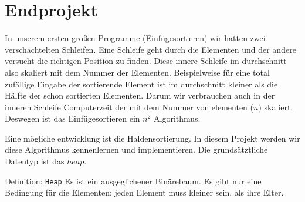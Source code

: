 \section{Endprojekt}


In unserem ersten großen Programme (Einfügesortieren) wir hatten
zwei verschachtelten Schleifen. Eine Schleife geht durch die Elementen
und der andere versucht die richtigen Position zu finden. Diese
innere Schleife im durchschnitt also skaliert mit dem Nummer der Elementen.
Beispielweise für eine total zufällige Eingabe der sortierende Element ist im 
durchschnitt kleiner als die Hälfte der schon sortierten Elementen. Darum 
wir verbrauchen  auch in der inneren Schleife Computerzeit der mit 
dem Nummer von elementen ($n$) skaliert. Deswegen ist das Einfügesortieren
ein $n^2$ Algorithmus.

Eine mögliche entwicklung ist die Haldensortierung. In diesem Projekt werden wir 
diese Algorithmus kennenlernen und implementieren. Die grundsätztliche Datentyp ist 
das $heap$.

\begin{myexampleblock}{Definition: \texttt{Heap}}
Es ist ein ausgeglichener Binärebaum. Es gibt nur eine Bedingung für die Elementen:
jeden Element muss kleiner sein, als ihre Elter.
\end{myexampleblock} 

